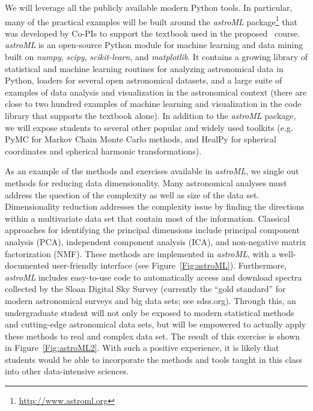 We will leverage all the publicly available modern Python tools. In
particular, many of the practical examples
will be built around the {\it astroML}
package\footnote{\url{http://www.astroml.org}} that was developed by
Co-PIs to support the textbook used in the proposed \astrocl\
course. {\it astroML} is an open-source Python module for machine learning
and data mining built on {\it numpy}, {\it scipy}, {\it scikit-learn},
and {\it matplotlib}. It
contains a growing library of statistical and machine learning
routines for analyzing astronomical data in Python, loaders for
several open astronomical datasets, and a large suite of examples of
data analysis and visualization in the astronomical context
(there are close to
two hundred examples of machine learning and visualization in the code
library that supports the textbook alone). In addition to the {\it
  astroML} package, we will expose students to several other popular
and widely used toolkits (e.g. PyMC for Markov Chain Monte Carlo
methods, and HealPy for spherical coordinates and spherical harmonic
transformations).

As an example of the methods and exercises available in {\it astroML},
we single out methods for reducing data dimensionality. Many
astronomical analyses must address the question of the complexity as
well as size of the data set. Dimensionality reduction addresses the
complexity issue by finding the directions within a multivariate data
set that contain most of the information. Classical approaches for
identifying the principal dimensions include principal component
analysis (PCA), independent component analysis (ICA), and non-negative
matrix factorization (NMF). These methods are implemented in {\it
  astroML}, with a well-documented user-friendly interface (see
Figure~\ref{Fig:astroML}). Furthermore, {\it astroML} includes
easy-to-use code to automatically access and download spectra
collected by the Sloan Digital Sky Survey (currently the ``gold
standard'' for modern astronomical surveys and big data sets; see
sdss.org).  Through this, an undergraduate student will not only be
exposed to modern statistical methods and cutting-edge astronomical
data sets, but will be empowered to actually apply these methods to
real and complex data set.  The result of this exercise is shown in
Figure~\ref{Fig:astroML2}.  With such a positive experience, it is
likely that students would be able to incorporate the methods and
tools taught in this class into other data-intensive sciences.

